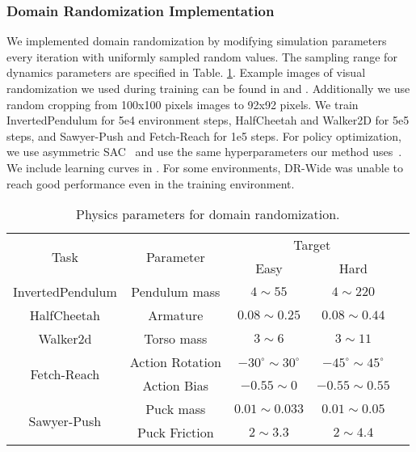 \subsubsection{\textbf{Domain Randomization Implementation}}
\label{sec:dr_implementation}
We implemented domain randomization by modifying simulation parameters every iteration with uniformly sampled random values. The sampling range for dynamics parameters are specified in Table. \ref{tab:dr_dynamics}. Example images of visual randomization we used during training can be found in  and . Additionally we use random cropping from 100x100 pixels images to 92x92 pixels.  We train InvertedPendulum for 5e4 environment steps, HalfCheetah and Walker2D for 5e5 steps, and Sawyer-Push and Fetch-Reach for 1e5 steps. For policy optimization, we use asymmetric SAC~\citep{pinto2017asymmetric} and use the same hyperparameters our method uses~.  We include learning curves in .  For some environments, DR-Wide was unable to reach good performance even in the training environment.

\begin{table}[ht]
\centering
\caption{Physics parameters for domain randomization.}
\begin{tabular}{ ccccc } 
 \toprule
 \multirow{2}{7.5em}{\centering Task} & \multirow{2}{6.5em}{\centering Parameter} & \multicolumn{2}{c}{Target} \\ 
 & & Easy & Hard \\
 \midrule
 InvertedPendulum & Pendulum mass & $4 \sim 55$ & $4 \sim 220$ \\ 
 \midrule
 HalfCheetah & Armature & $0.08 \sim 0.25$ & $0.08 \sim 0.44$ \\ 
 \midrule
 Walker2d & Torso mass & $3 \sim 6$ & $3 \sim 11$ \\ 
 \midrule
 \multirow{2}{7.5em}{\centering Fetch-Reach} & Action Rotation & $-30^{\circ}\sim30^{\circ}$ & $-45^{\circ}\sim45^{\circ}$\\
 & Action Bias & $-0.55 \sim 0$ & $-0.55 \sim 0.55$ \\
 \midrule
\multirow{2}{7.5em}{\centering Sawyer-Push} & Puck mass & $0.01 \sim 0.033$ & $0.01 \sim 0.05$ \\ 
& Puck Friction & $ 2 \sim 3.3$ & $2 \sim 4.4$\\
 \bottomrule
\end{tabular}
\label{tab:dr_dynamics}
\end{table}

